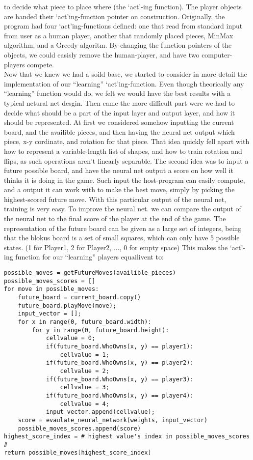\documentclass{report}
\begin{document}
	to decide what piece to place where (the `act'-ing function). The player objects are handed their `act'ing-function pointer on construction. Originally, the program had four `act'ing-functions
	defined: one that read from standard input from user as	a human player, another that randomly placed pieces, MinMax algorithm, and a Greedy algoritm. By changing the function pointers of
	the objects, we could easisly remove the human-player, and have two computer-players compete.\\
	Now that we knew we had a soild base, we started to consider in more detail the implementation of our ``learning'' `act'ing-function. Even though theorically any ``learning'' function would do,
	we felt we would have the best results with a typical netural net desgin. Then came the more difficult part were we had to decide what should be a part of the input layer and output layer,
	and how it should be represented. At first we considered somehow inputting the current board, and the availible pieces, and then having the neural net output which piece, x-y cordinate,
	and rotation for that piece. That idea quickly fell apart with how to represent a variable-length list of shapes, and how to train rotation and flips, as such operations aren't linearly
	separable. The second idea was to input a future possible board, and have the neural net output a score on how well it thinks it is doing in the game. Such input the host-program can easily
	compute, and a output it can work with to make the best move, simply by picking the highest-scored future move. With this particular output of the neural net, training is very easy. To
	improve the neural net. we can compare the output of the neural net to the final score of the player at the end of the game. The representation of the future board can be given as a large set of
	integers, being that the blokus board is a set of small squares, which can only have 5 possible states. (1 for Player1, 2 for Player2, ..., 0 for empty space) This makes the `act'-ing
	function for our ``learning'' players equailivent to:
	\lstset{language=Python}
	\lstset{basicstyle=\footnotesize}
	\begin{lstlisting}
possible_moves = getFutureMoves(availible_pieces)
possible_moves_scores = []
for move in possible_moves:
	future_board = current_board.copy()
	future_board.playMove(move);
	input_vector = [];
	for x in range(0, future_board.width):
		for y in range(0, future_board.height):
			cellvalue = 0;
			if(future_board.WhoOwns(x, y) == player1):
				cellvalue = 1;
			if(future_board.WhoOwns(x, y) == player2):
				cellvalue = 2;
			if(future_board.WhoOwns(x, y) == player3):
				cellvalue = 3;
			if(future_board.WhoOwns(x, y) == player4):
				cellvalue = 4;
			input_vector.append(cellvalue);
	score = evaulate_neural_network(weights, input_vector)
	possible_moves_scores.append(score)
highest_score_index = # highest value's index in possible_moves_scores #
return possible_moves[highest_score_index]
	\end{lstlisting}
	
	\\
		
	
\end{document}

